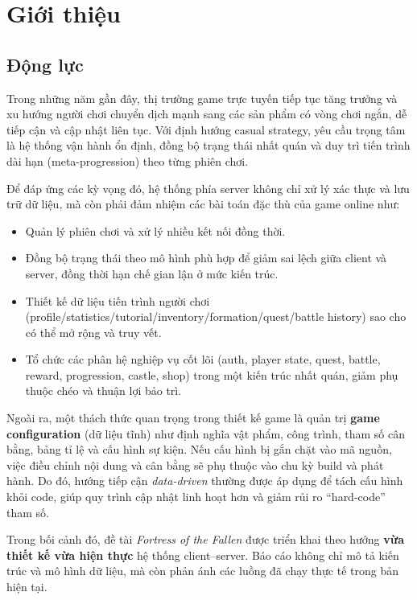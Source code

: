 ﻿\section{Giới thiệu}

\subsection{Động lực}

Trong những năm gần đây, thị trường game trực tuyến tiếp tục tăng trưởng và xu hướng người chơi chuyển dịch mạnh sang các sản phẩm có vòng chơi ngắn, dễ tiếp cận và cập nhật liên tục\cite{newzoo-report}. Với định hướng casual strategy, yêu cầu trọng tâm là hệ thống vận hành ổn định, đồng bộ trạng thái nhất quán và duy trì tiến trình dài hạn (meta-progression) theo từng phiên chơi.

Để đáp ứng các kỳ vọng đó, hệ thống phía server không chỉ xử lý xác thực và lưu trữ dữ liệu, mà còn phải đảm nhiệm các bài toán đặc thù của game online như:
\begin{itemize}
    \item Quản lý phiên chơi và xử lý nhiều kết nối đồng thời.
    \item Đồng bộ trạng thái theo mô hình phù hợp để giảm sai lệch giữa client và server, đồng thời hạn chế gian lận ở mức kiến trúc\cite{moriarty-networked}.
    \item Thiết kế dữ liệu tiến trình người chơi (profile/\allowbreak statistics/\allowbreak tutorial/\allowbreak inventory/\allowbreak formation/\allowbreak quest/\allowbreak battle history) sao cho có thể mở rộng và truy vết.
    \item Tổ chức các phân hệ nghiệp vụ cốt lõi (auth, player state, quest, battle, reward, progression, castle, shop) trong một kiến trúc nhất quán, giảm phụ thuộc chéo và thuận lợi bảo trì\cite{gregory-engine}.
\end{itemize}

Ngoài ra, một thách thức quan trọng trong thiết kế game là quản trị \textbf{game configuration} (dữ liệu tĩnh) như định nghĩa vật phẩm, công trình, tham số cân bằng, bảng tỉ lệ và cấu hình sự kiện. Nếu cấu hình bị gắn chặt vào mã nguồn, việc điều chỉnh nội dung và cân bằng sẽ phụ thuộc vào chu kỳ build và phát hành. Do đó, hướng tiếp cận \textit{data-driven} thường được áp dụng để tách cấu hình khỏi code, giúp quy trình cập nhật linh hoạt hơn và giảm rủi ro ``hard-code'' tham số\cite{adams-game-design,schell-art}.

Trong bối cảnh đó, đề tài \textit{Fortress of the Fallen} được triển khai theo hướng \textbf{vừa thiết kế vừa hiện thực} hệ thống client--server. Báo cáo không chỉ mô tả kiến trúc và mô hình dữ liệu, mà còn phản ánh các luồng đã chạy thực tế trong bản hiện tại.

